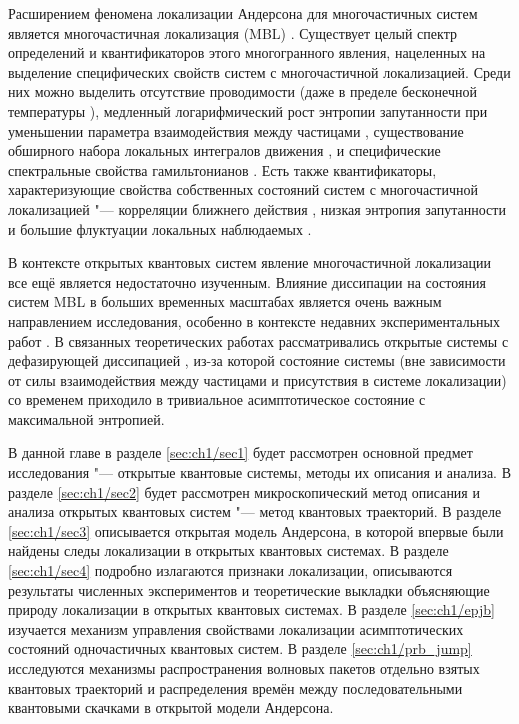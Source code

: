 Расширением феномена локализации Андерсона для многочастичных систем является многочастичная локализация (MBL) \cite{Basko2006, Gornyi2005}.
Существует целый спектр определений и квантификаторов этого многогранного явления, нацеленных на выделение специфических свойств систем с многочастичной локализацией.
Среди них можно выделить отсутствие проводимости \autocite{Gornyi2005} (даже в пределе бесконечной температуры \autocite{Basko2006}), медленный логарифмический рост энтропии запутанности при уменьшении параметра взаимодействия между частицами \autocite{Chiara2006, Znidaric2008, Bardarson2012, Serbyn2013_1}, существование обширного набора локальных интегралов движения \autocite{Serbyn2013_2}, и специфические спектральные свойства гамильтонианов \autocite{Oganesyan2007, Serbyn2016}.
Есть также квантификаторы, характеризующие свойства собственных состояний систем с многочастичной локализацией "--- корреляции ближнего действия \autocite{Pal2010}, низкая энтропия запутанности \autocite{Bauer2013, Kjll2014, Khemani2017} и большие флуктуации локальных наблюдаемых \autocite{Bera2015}.

В контексте открытых квантовых систем явление многочастичной локализации все ещё является недостаточно изученным. Влияние диссипации на состояния систем  MBL в больших временных масштабах является очень важным направлением исследования, особенно в контексте недавних экспериментальных работ \autocite{Schreiber2015, Choi2016, Bordia2017, Smith2016}. В связанных теоретических работах \autocite{Levi2016, Fischer2016, Medvedyeva2016} рассматривались открытые системы с дефазирующей диссипацией \autocite{Poletti2013}, из-за которой состояние системы (вне зависимости от силы взаимодействия между частицами и присутствия в системе локализации) со временем приходило в тривиальное асимптотическое состояние с максимальной энтропией.

В данной главе в разделе \cref{sec:ch1/sec1} будет рассмотрен основной предмет исследования "--- открытые квантовые системы, методы их описания и анализа. 
В разделе \cref{sec:ch1/sec2} будет рассмотрен микроскопический метод описания и анализа открытых квантовых систем "--- метод квантовых траекторий.
В разделе \cref{sec:ch1/sec3} описывается открытая модель Андерсона, в которой впервые были найдены следы локализации в открытых квантовых системах.
В разделе \cref{sec:ch1/sec4} подробно излагаются признаки локализации, описываются результаты численных экспериментов и теоретические выкладки объясняющие природу локализации в открытых квантовых системах. 
В разделе \cref{sec:ch1/epjb} изучается механизм управления свойствами локализации асимптотических состояний одночастичных квантовых систем. 
В разделе \cref{sec:ch1/prb_jump} исследуются механизмы распространения волновых пакетов отдельно взятых квантовых траекторий и распределения времён между последовательными квантовыми скачками в открытой модели Андерсона.

